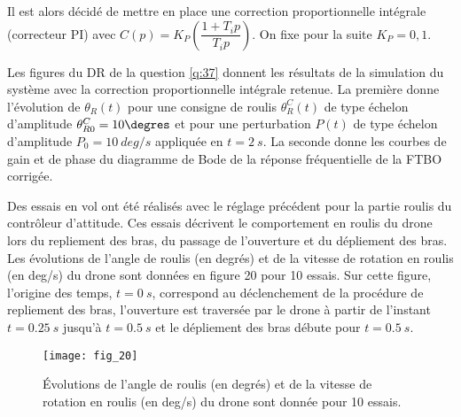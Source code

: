Il est alors décidé de mettre en place une correction proportionnelle intégrale (correcteur PI)
avec $C(p) = K_P\left(\dfrac{1+T_i p}{T_i p}\right)$. On fixe pour la suite $K_P = 0,1$.

\ifprof
\begin{corrige}
\end{corrige}
\else
\fi

Les figures du DR de la question \ref{q:37} donnent les résultats de la simulation du système avec la
correction proportionnelle intégrale retenue. La première donne l’évolution de $\theta_R(t)$ pour une
consigne de roulis $\theta_R^C(t)$ de type échelon d’amplitude $\theta_{R0}^C = 10\degres$ et pour une perturbation $P(t)$ de
type échelon d’amplitude $P_0 =\SI{10}{deg/s}$ appliquée en $t = \SI{2}{s}$. La seconde donne les courbes
de gain et de phase du diagramme de Bode de la réponse fréquentielle de la FTBO corrigée.

\ifprof
\begin{corrige}
\end{corrige}
\else
\fi

Des essais en vol ont été réalisés avec le réglage précédent pour la partie roulis du contrôleur
d’attitude. Ces essais décrivent le comportement en roulis du drone lors du repliement des
bras, du passage de l’ouverture et du dépliement des bras. Les évolutions de l’angle de
roulis (en degrés) et de la vitesse de rotation en roulis (en \si{deg/s}) du drone sont données
en figure 20 pour 10 essais. Sur cette figure, l’origine des temps, $t = \SI{0}{s}$, correspond au
déclenchement de la procédure de repliement des bras, l’ouverture est traversée par le drone
à partir de l’instant $t = \SI{0,25}{s}$ jusqu’à $t = \SI{0,5}{s}$ et le dépliement des bras débute pour $t = \SI{0,5}{s}$.

\begin{figure}[H]
\centering
\texttt{[image: fig\_20]}
\caption{\label{fig:20} ­Évolutions de l’angle de roulis (en degrés) et de la vitesse de rotation en roulis
(en \si{deg/s}) du drone sont donnée pour 10 essais.}
\end{figure}

